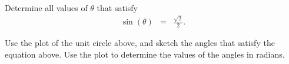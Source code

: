 
\begin{problem}
\item Determine all values of $\theta$ that satisfy
  \begin{eqnarray*}
    \sin(\theta) & = & \frac{\sqrt{2}}{2}.
  \end{eqnarray*}



  Use the plot of the unit circle above, and sketch the angles that
  satisfy the equation above. Use the plot to determine the values of
  the angles in radians.

  \vfill

\end{problem}


